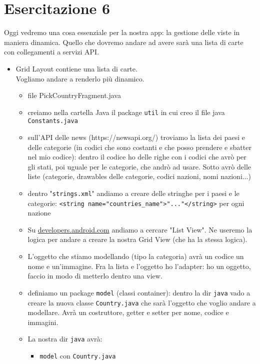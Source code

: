
\chapter{Esercitazione 6}
\par Oggi vedremo una cosa essenziale per la nostra app: la gestione delle viste in maniera dinamica. Quello che dovremo andare ad avere sarà una lista di carte con collegamenti a servizi API.
\begin{itemize}
    \item Grid Layout contiene una lista di carte.\\
    Vogliamo andare a renderlo più dinamico.
    \begin{itemize}
        \item file PickCountryFragment.java
        \item creiamo nella cartella Java il package \texttt{util} in cui creo il file java \texttt{Constants.java}
        \item sull'API delle news (https://newsapi.org/) troviamo la lista dei paesi e delle categorie (in codici che sono costanti e che posso prendere e sbatter nel mio codice): dentro il codice ho delle righe con i codici che avrò per gli stati, poi uguale per le categorie, che andrò ad usare. Sotto avrò delle liste (categorie, drawables delle categorie, codici nazioni, nomi nazioni...)
        \item dentro "\texttt{strings.xml}" andiamo a creare delle stringhe per i paesi e le categorie: \texttt{<string name="countries\_name">"..."</string>} per ogni nazione
        \item Su \url{developers.android.com} andiamo a cercare "List View". Ne useremo la logica per andare a creare la nostra Grid View (che ha la stessa logica).
        \item L'oggetto che stiamo modellando (tipo la categoria) avrà un codice un nome e un'immagine. Fra la lista e l'oggetto ho l'adapter: ho un oggetto, faccio in modo di metterlo dentro una view.
        \item definiamo un package \texttt{model} (classi container): dentro la dir \texttt{java} vado a creare la nuova classe \texttt{Country.java} che sarà l'oggetto che voglio andare a modellare. Avrà un costruttore, getter e setter per nome, codice e immagini.
        \item La nostra dir \texttt{java} avrà:
        \begin{itemize}
            \item \texttt{model} con \texttt{Country.java}

\end{itemize}
\end{itemize}
\end{itemize}
